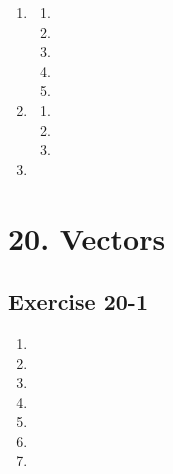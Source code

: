 \begin{multicols}{4}
\begin{enumerate}[noitemsep, label=\textbf{(\arabic*)} ]
\begin{enumerate}[noitemsep, label=\textbf{(\alph*)} ]
\item
\end{enumerate}
\item
\begin{enumerate}[noitemsep, label=\textbf{(\alph*)} ]
 \item 
\item
\item
\item
\item 
\end{enumerate}
\item
\begin{enumerate}[noitemsep, label=\textbf{(\alph*)} ]
 \item 
\item
\item
\end{enumerate}
\item
 \end{enumerate}
\end{multicols}

\section{20. Vectors}
\subsection{Exercise 20-1}
\begin{multicols}{3}
 \begin{enumerate}[noitemsep, label=\textbf{(\arabic*)} ]
  \item 
\item
\item 
\item
\item
\item
\item
 \end{enumerate}
\end{multicols}

